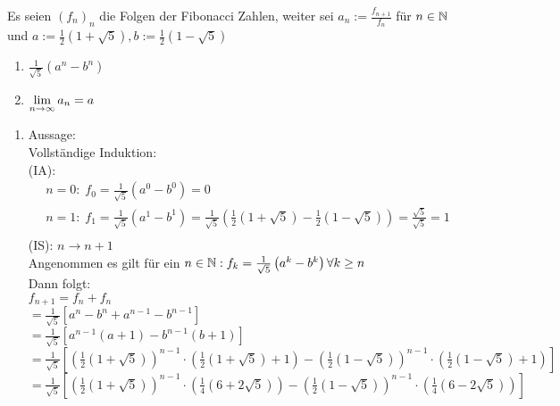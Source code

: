 \documentclass[../ana1u.tex]{subfiles}
\begin{document}
\begin{bsp}
    Es seien \((f_n)_n\) die Folgen der Fibonacci Zahlen, weiter sei \(a_n := \frac{f_{n+1}}{f_n}\) für \(n \in \mathbb{N}\) und \(a := \frac{1}{2}(1 + \sqrt{5}), b := \frac{1}{2}(1 - \sqrt{5})\)\\
    \begin{enumerate}
        \item \(\frac{1}{\sqrt{5}}\left(a^n-b^n\right)\)
        \item \(\lim\limits_{n\rightarrow\infty} a_n = a\)
    \end{enumerate}
    \begin{bew}
        \begin{enumerate}
            \item Aussage:\\
                Vollständige Induktion:\\
                (IA):
                \begin{align*}
                    &n = 0: \; f_0 = \frac{1}{\sqrt{5}} \left(a^0-b^0 \right) = 0\\		
                    &n = 1: \; f_1 = \frac{1}{\sqrt{5}} \left(a^1-b^1 \right) = \frac{1}{\sqrt{5}} \left(\frac{1}{2}(1 + \sqrt{5})-\frac{1}{2}(1 - \sqrt{5}) \right) = \frac{\sqrt{5}}{\sqrt{5}} = 1\\		
                \end{align*}
                (IS): \(n \rightarrow n+1\)\\
                Angenommen es gilt für ein \(n \in \mathbb{N}: f_k = \frac{1}{\sqrt{5}}\left(a^k-b^k\right) \forall k \geq n\)\\
                Dann folgt:\\
                \(f_{n+1} = f_n + f_n\)\\
                \(= \frac{1}{\sqrt{5}}\left[a^n - b^n +a^{n-1} - b^{n-1}\right]\)\\
                \(= \frac{1}{\sqrt{5}}\left[a^{n-1}(a+1) - b^{n-1}(b+1)\right]\)\\
                \(= \frac{1}{\sqrt{5}}\left[\left(\frac{1}{2}\left(1 + \sqrt{5}\right)\right)^{n-1} \cdot\left(\frac{1}{2}\left(1 + \sqrt{5}\right)+1\right) - \left(\frac{1}{2}\left(1 - \sqrt{5}\right)\right)^{n-1}\cdot\left(\frac{1}{2}\left(1 - \sqrt{5}\right)+1\right)\right]\)\\
                \(= \frac{1}{\sqrt{5}}\left[\left(\frac{1}{2}\left(1 + \sqrt{5}\right)\right)^{n-1}\cdot\left(\frac{1}{4}\left(6 + 2\sqrt{5}\right)\right) - \left(\frac{1}{2}\left(1 - \sqrt{5}\right)\right)^{n-1}\cdot\left(\frac{1}{4}\left(6 - 2\sqrt{5}\right)\right)\right]\)\\

\end{enumerate}
\end{bew}
\end{bsp}
\end{document}
